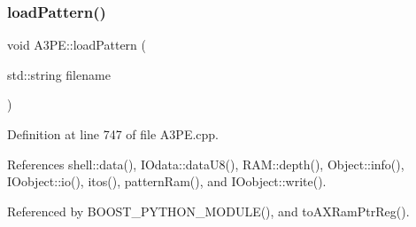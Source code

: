 \subsubsection{\texorpdfstring{load\+Pattern()}{loadPattern()}}
{\footnotesize\ttfamily void A3\+P\+E\+::load\+Pattern (\begin{DoxyParamCaption}\item[{std\+::string}]{filename }\end{DoxyParamCaption})}



Definition at line 747 of file A3\+P\+E.\+cpp.



References shell\+::data(), I\+Odata\+::data\+U8(), R\+A\+M\+::depth(), Object\+::info(), I\+Oobject\+::io(), itos(), pattern\+Ram(), and I\+Oobject\+::write().



Referenced by B\+O\+O\+S\+T\+\_\+\+P\+Y\+T\+H\+O\+N\+\_\+\+M\+O\+D\+U\+L\+E(), and to\+A\+X\+Ram\+Ptr\+Reg().


